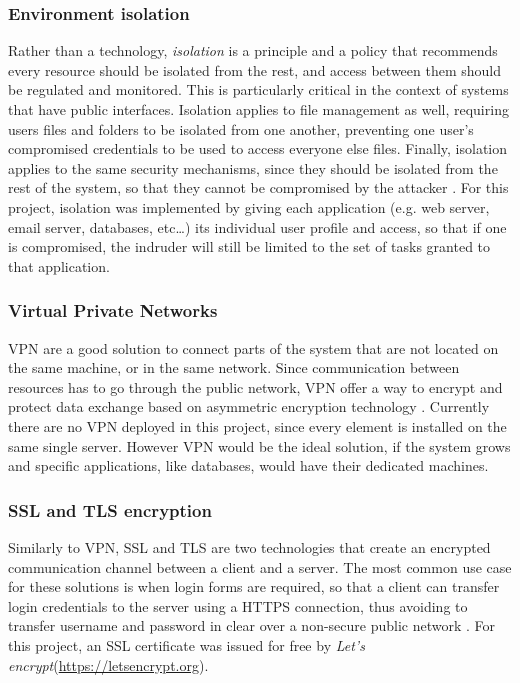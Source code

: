 \subsubsection{Environment isolation}
Rather than a technology, \emph{isolation} is a principle and a policy that
recommends every resource should be isolated from the rest, and access between
them should be regulated and monitored. This is particularly critical in the
context of systems that have public interfaces. Isolation applies to file
management as well, requiring users files and folders to be isolated from one
another, preventing one user's compromised credentials to be used to access
everyone else files. Finally, isolation applies to the same security
mechanisms, since they should be isolated from the rest of the system, so that
they cannot be compromised by the attacker \cite{WS15}. For this project,
isolation was implemented by giving each application (e.g. web server, email
server, databases, etc\ldots) its individual user profile and access, so that if
one is compromised, the indruder will still be limited to the set of tasks
granted to that application.

\subsubsection{Virtual Private Networks}
VPN are a good solution to connect parts of the system that are not located on
the same machine, or in the same network. Since communication between resources
has to go through the public network, VPN offer a way to encrypt and protect
data exchange based on asymmetric encryption technology \cite{WS15}. Currently
there are no VPN deployed in this project, since every element is installed
on the same single server. However VPN would be the ideal solution, if the
system grows and specific applications, like databases, would have their
dedicated machines.

\subsubsection{SSL and TLS encryption}
Similarly to VPN, SSL and TLS are two technologies that create an encrypted
communication channel between a client and a server. The most common use case
for these solutions is when login forms are required, so that a client can
transfer login credentials to the server using a HTTPS connection, thus avoiding
to transfer username and password in clear over a non-secure public network
\cite{WS15}. For this project, an SSL certificate was issued for free by
\emph{Let's encrypt}\texttrademark (\url{https://letsencrypt.org}).


